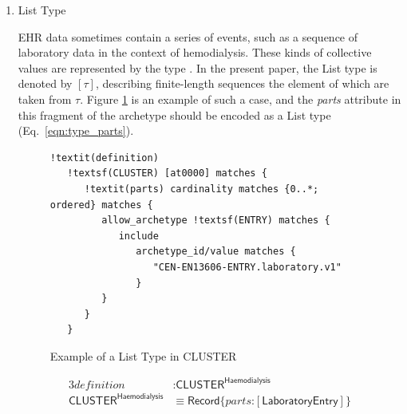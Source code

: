 \documentclass[preprint,3p,onecolumn,times,review]{article}
\begin{document}
{\begin{enumerate}
\begin{figure}[!htbp]
  \begin{alignat}{3}
    value & : \mathsf{DV\_CODED\_TEXT^{HepatitisVirus}} \label{eqn:value_hepatitis}\\
    \mathsf{DV\_CODED\_TEXT^{HepatitisVirus}} & \equiv \mathsf{Record}\{defining\_code \text{:} \mathsf{Variant}\langle \text{at1000} \text{:} \mathsf{Unit},~\text{at1001} \text{:} \mathsf{Unit} \rangle\} \label{eqn:type_hepatitis}
  \end{alignat}
\end{figure}

\item List Type

  EHR data sometimes contain a series of events, such as a sequence of laboratory data in the context of hemodialysis. These kinds of collective values are represented by the {} type \cite{cardelli04:_type_system,pierce02:_types_progr_languag,geuvers09:_introd_type_theor}.
  In the present paper, the {\sf List} type is denoted by $[\tau]$, describing finite-length sequences the element of which are taken from $\tau$.
  Figure \ref{fig:example_list_type} is an example of such a case, and the {\it{parts}} attribute in this fragment of the archetype should be encoded as a {\sf List} type (Eq.~\ref{eqn:type_parts}).


\begin{figure}[!htbp]
\begin{minipage}{1.0\linewidth}
\begin{Verbatim}[frame=single,fontsize=\small, commandchars=!\(\)]
!textit(definition)
   !textsf(CLUSTER) [at0000] matches {
      !textit(parts) cardinality matches {0..*; ordered} matches {
         allow_archetype !textsf(ENTRY) matches {
            include
               archetype_id/value matches {
                  "CEN-EN13606-ENTRY.laboratory.v1"
               }
         }
      }
   }
\end{Verbatim}
\end{minipage}
  \caption{Example of a List Type in CLUSTER}\label{fig:example_list_type}
\end{figure}

\begin{figure}[!htbp]
  \begin{alignat}{3}
    definition & \text{:} \mathsf{CLUSTER^{Haemodialysis}}\\
    \mathsf{CLUSTER^{Haemodialysis}} & \equiv \mathsf{Record}\{parts \text{:} [\mathsf{LaboratoryEntry}]\} \label{eqn:type_parts}
  \end{alignat}
\end{figure}


\end{enumerate}}
\end{document}

